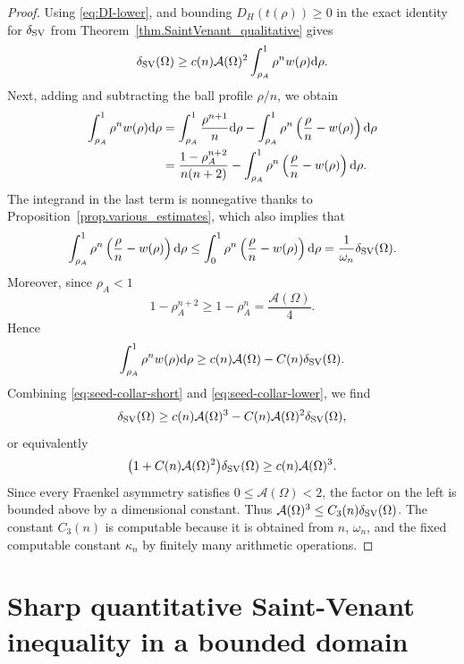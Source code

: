 \documentclass[11pt]{amsart}
\theoremstyle{plain}
\theoremstyle{definition}
\def\dd{{\rm d}}
\newcommand\SV{\mathop{\rm SV}}
\begin{document}
\begin{proof}
Using \eqref{eq:DI-lower}, and bounding $D_H(t(\rho)) \ge 0$ in the exact identity for $\delta_{\rm SV}$ from Theorem~\ref{thm.SaintVenant_qualitative} gives
\begin{equation}\label{eq:seed-collar-short}
 \delta_{\SV}(\Omega)\ge c(n)\mathcal{A}(\Omega)^2
 \int_{\rho_A}^1\rho^n w (\rho)\dd \rho .
\end{equation}
Next, adding and subtracting
the ball profile $\rho/n$, we obtain
\begin{align*}
 \int_{\rho_A}^1\rho^n w (\rho)\dd \rho
 &=\int_{\rho_A}^1\frac{\rho^{n+1}}{n}\dd \rho
   -\int_{\rho_A}^1\rho^n
      \left(\frac{\rho}{n}- w (\rho)\right)\dd \rho\\
 &=\frac{1-\rho_A^{n+2}}{n(n+2)}
   -\int_{\rho_A}^1\rho^n
      \left(\frac{\rho}{n}- w (\rho)\right)\dd\rho.
\end{align*}
The integrand in the last term is nonnegative thanks to Proposition~\ref{prop.various_estimates}, which also implies that
\[
 \int_{\rho_A}^1\rho^n
      \left(\frac{\rho}{n}- w (\rho)\right)\dd\rho
 \le \int_0^1\rho^n
      \left(\frac{\rho}{n}- w (\rho)\right)\dd\rho
 =\frac{1}{\omega_n}\delta_{\SV}(\Omega).
\]
Moreover, since $\rho_A < 1$
\[
 1-\rho_A^{n+2}
 \ge
 1-\rho_A^{n}
 =\frac{\mathcal{A}(\Omega)}{4}.
\]
Hence
\begin{equation}\label{eq:seed-collar-lower}
 \int_{\rho_A}^1\rho^n w (\rho)\dd \rho
 \ge c(n)\mathcal{A}(\Omega)-C(n)\delta_{\SV}(\Omega).
\end{equation}
Combining \eqref{eq:seed-collar-short} and
\eqref{eq:seed-collar-lower}, we find
\[
 \delta_{\SV}(\Omega)
 \ge c(n)\mathcal{A}(\Omega)^3-C(n)\mathcal{A}(\Omega)^2\delta_{\SV}(\Omega),
\]
or equivalently
\[
 \bigl(1+C(n)\mathcal{A}(\Omega)^2\bigr)\delta_{\SV}(\Omega)\ge c(n)\mathcal{A}(\Omega)^3.
\]
Since every Fraenkel asymmetry satisfies $0\le \mathcal{A}(\Omega)<2$, the factor on
the left is bounded above by a dimensional constant. Thus
$\mathcal{A}(\Omega)^3\le C_3(n)\delta_{\SV}(\Omega)$. The constant $C_3(n)$ is computable because it is obtained from $n$, $\omega_n$, and the fixed computable constant $\kappa_n$ by finitely many
arithmetic operations.
\end{proof}


\section{Sharp quantitative Saint-Venant inequality in a bounded domain}\label{sec.stability_SV_bounded}
\end{document}
